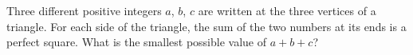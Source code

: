 Three different positive integers $a$, $b$, $c$ are written at the three vertices of a triangle. For each side of the triangle, the sum of the two numbers at its ends is a perfect square. What is the smallest possible value of $a+b+c$?
